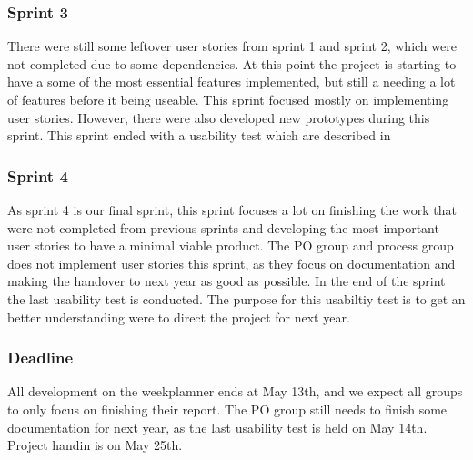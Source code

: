 \subsubsection{Sprint 3}
There were still some leftover user stories from sprint 1 and sprint 2, which were not completed due to some dependencies. 
At this point the project is starting to have a some of the most essential features implemented, but still a needing a lot of features before it being useable. 
This sprint focused mostly on implementing user stories.
However, there were also developed new prototypes during this sprint.
This sprint ended with a usability test which are described in 

\subsubsection{Sprint 4}
As sprint 4 is our final sprint, this sprint focuses a lot on finishing the work that were not completed from previous sprints and developing the most important user stories to have a minimal viable product.
The PO group and process group does not implement user stories this sprint, as they focus on documentation and making the handover to next year as good as possible.
In the end of the sprint the last usability test is conducted.
The purpose for this usabiltiy test is to get an better understanding were to direct the project for next year.

\subsubsection{Deadline}
All development on the weekplamner ends at May 13th, and we expect all groups to only focus on finishing their report.
The PO group still needs to finish some documentation for next year, as the last usability test is held on May 14th.
Project handin is on May 25th.

